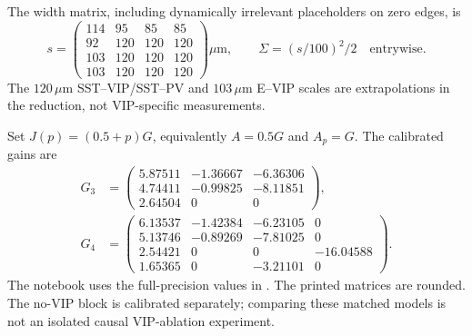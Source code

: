 \documentclass[11pt]{article}
\begin{document}
The width matrix, including dynamically irrelevant placeholders on zero edges, is
\begin{equation}
 s=\begin{pmatrix}114&95&85&85\\92&120&120&120\\103&120&120&120\\103&120&120&120\end{pmatrix}\mu\mathrm m,
 \qquad \Sigma=(s/100)^2/2\quad\text{entrywise}.
\end{equation}
The $120\,\mu$m SST--VIP/SST--PV and $103\,\mu$m E--VIP scales are
extrapolations in the reduction, not VIP-specific measurements.

Set $J(p)=(0.5+p)G$, equivalently $A=0.5G$ and $A_p=G$. The calibrated gains are
\begin{align}
 G_3&=\begin{pmatrix}
 5.87511&-1.36667&-6.36306\\
 4.74411&-0.99825&-8.11851\\
 2.64504&0&0
 \end{pmatrix},\\
 G_4&=\begin{pmatrix}
 6.13537&-1.42384&-6.23105&0\\
 5.13746&-0.89269&-7.81025&0\\
 2.54421&0&0&-16.04588\\
 1.65365&0&-3.21101&0
 \end{pmatrix}.
 \label{eq:gains}
\end{align}
The notebook uses the full-precision values in
. The printed matrices
are rounded. The no-VIP block is calibrated separately; comparing these matched
models is not an isolated causal VIP-ablation experiment.

\newpage
\end{document}
